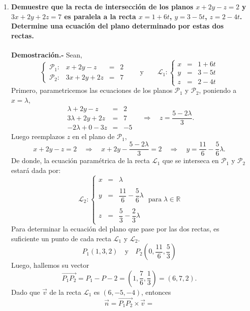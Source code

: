 \begin{enumerate}
    \item \textbf{\boldmath Demuestre que la recta de intersección de los planos $x + 2y - z = 2$ y $3x + 2y + 2z = 7$ es paralela a la recta $x = 1 + 6t$, $y = 3 - 5t$, $z = 2 - 4t$. Determine una ecuación del plano determinado por estas dos rectas.\\\\
	Demostración.-}\; Sean,
	$$
	\left\{\begin{array}{rrcl}
		\mathscr{P}_1:&x+2y-z &=& 2\\
		\mathscr{P}_2:&3x+2y+2z &=& 7
	\end{array}\right. \qquad \mbox{y}\qquad
	\mathscr{L}_1:\left\{\begin{array}{rcl}
		x &=& 1+6t\\
		y &=& 3-5t\\
		z &=& 2-4t
	\end{array}\right.
	$$
	Primero, parametricemos las ecuaciones de los planos $\mathscr{P}_1$ y $\mathscr{P}_2$, poniendo a $x=\lambda$,
	$$
	\begin{array}{rcr} 
		\lambda+2y-z &=& 2\\
		3\lambda+2y+2z &=& 7\\
		\hline
		-2\lambda + 0 - 3z &=& -5
	    \end{array} \quad \Rightarrow \quad z=\dfrac{5-2\lambda}{3}.
	$$
	Luego reemplazos $z$ en el plano de $\mathscr{P}_1$, 
	$$x+2y-z=2\quad \Rightarrow \quad x+2y-\dfrac{5-2\lambda}{3}=2\quad \Rightarrow \quad y=\dfrac{11}{6}-\dfrac{5}{6}\lambda.$$
	De donde, la ecuación paramétrica de la recta $\mathscr{L}_1$ que se interseca en $\mathscr{P}_1$ y $\mathscr{P}_2$ estará dada por:
	$$
	\mathscr{L}_2:\left\{\begin{array}{rcl}
		x &=& \lambda\\\\
		y &=& \dfrac{11}{6}-\dfrac{5}{6}\lambda\\\\
		z &=& \dfrac{5}{3}-\dfrac{2}{3}\lambda
	\end{array}\right. \; \mbox{para}\; \lambda\in \mathbb{R}
	$$
	Para determinar la ecuación del plano que pase por las dos rectas, es suficiente un punto de cada recta $\mathscr{L}_1$ y $\mathscr{L}_2$.
	$$P_1(1,3,2)\quad \mbox{y}\quad P_2(0,\frac{11}{6},\dfrac{5}{3})$$
	Luego, hallemos su vector
	$$\vec{P_1 P_2}=P_1-P-2=\left(1,\dfrac{7}{6},\dfrac{1}{3}\right)=(6,7,2).$$
	Dado que $\vec{v}$ de la recta $\mathscr{L}_1$ es $(6,-5,-4)$, entonces
	$$
	\vec{n}=\vec{P_1 P_2}\times \vec{v} =
$$
\end{enumerate}
